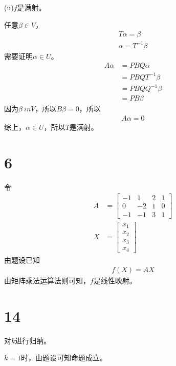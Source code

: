 \documentclass{article}
\begin{document}
\begin{itemize}
        (ii)$f$是满射。

        任意$\beta \in V$，
        \begin{align*}
          T \alpha = \beta \\
          \alpha = T^{-1} \beta
        \end{align*}
        需要证明$\alpha \in U$。
        \begin{align*}
          A \alpha & = PBQ \alpha       \\
                   & = PBQ T^{-1} \beta \\
                   & = PBQ Q^{-1} \beta \\
                   & = P B \beta
        \end{align*}
        因为$\beta \ in V$，所以$B \beta = 0$，所以
        \begin{align*}
          A \alpha = 0
        \end{align*}
        综上，$\alpha \in U$，所以$T$是满射。

\end{itemize}

\section*{6}

令\begin{align*}
  A & = \begin{bmatrix}
          -1 & 1  & 2 & 1 \\
          0  & -2 & 1 & 0 \\
          -1 & -1 & 3 & 1
        \end{bmatrix} \\
  X & = \begin{bmatrix}
          x_1 \\
          x_2 \\
          x_3 \\
          x_4
        \end{bmatrix}
\end{align*}
由题设已知
\begin{align*}
  f(X) = A X
\end{align*}
由矩阵乘法运算法则可知，$f$是线性映射。

\section*{14}

对$k$进行归纳。

$k = 1$时，由题设可知命题成立。
\end{document}

